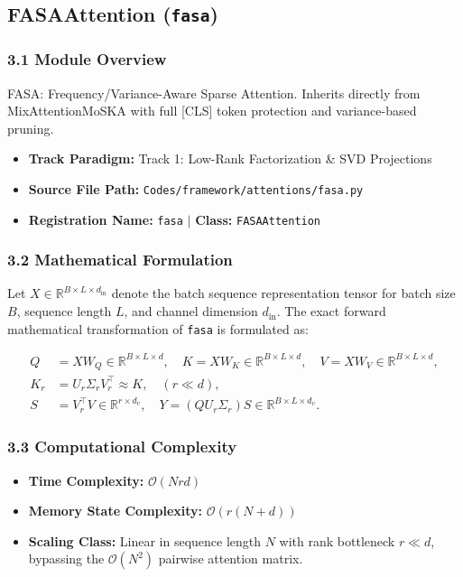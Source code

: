 \subsection{FASAAttention (\texttt{fasa})}
\label{sec:app_module_fasa}

\subsubsection*{3.1 Module Overview}
FASA: Frequency/Variance-Aware Sparse Attention. Inherits directly from MixAttentionMoSKA with full [CLS] token protection and variance-based pruning.
\begin{itemize}
    \item \textbf{Track Paradigm:} Track 1: Low-Rank Factorization & SVD Projections
    \item \textbf{Source File Path:} \texttt{Codes/framework/attentions/fasa.py}
    \item \textbf{Registration Name:} \texttt{fasa} $\mid$ \textbf{Class:} \texttt{FASAAttention}
\end{itemize}

\subsubsection*{3.2 Mathematical Formulation}
Let $X \in \mathbb{R}^{B \times L \times d_{\text{in}}}$ denote the batch sequence representation tensor for batch size $B$, sequence length $L$, and channel dimension $d_{\text{in}}$. The exact forward mathematical transformation of \texttt{fasa} is formulated as:

\begin{align}
Q &= X W_Q \in \mathbb{R}^{B \times L \times d}, \quad K = X W_K \in \mathbb{R}^{B \times L \times d}, \quad V = X W_V \in \mathbb{R}^{B \times L \times d}, \\
K_r &= U_r \Sigma_r V_r^\top \approx K, \quad (r \ll d), \\
S &= V_r^\top V \in \mathbb{R}^{r \times d_v}, \quad Y = (Q U_r \Sigma_r) S \in \mathbb{R}^{B \times L \times d_v}.
\end{align}


\subsubsection*{3.3 Computational Complexity}
\begin{itemize}
    \item \textbf{Time Complexity:} $\mathcal{O}(N r d)$
    \item \textbf{Memory State Complexity:} $\mathcal{O}(r(N + d))$
    \item \textbf{Scaling Class:} Linear in sequence length $N$ with rank bottleneck $r \ll d$, bypassing the $\mathcal{O}(N^2)$ pairwise attention matrix.
\end{itemize}

